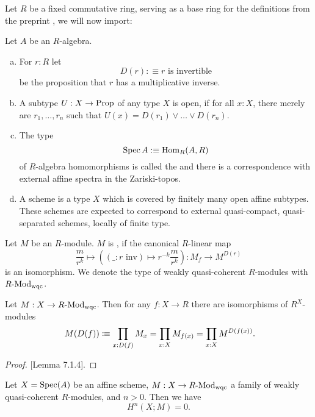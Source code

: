 
Let $R$ be a fixed commutative ring,
serving as a base ring for the definitions from the preprint \cite{draft},
we will now import:

\begin{definition}
  Let $A$ be an $R$-algebra.
  \begin{enumerate}[(a)]
  \item For $r:R$ let
    \[
      D(r):\equiv \text{$r$ is invertible}
    \]
    be the proposition that $r$ has a multiplicative inverse.
  \item A subtype $U:X\to \mathrm{Prop}$ of any type $X$ is open,
    if for all $x:X$, there merely are $r_1,\dots,r_n$ such that $U(x)=D(r_1)\vee \dots \vee D(r_n)$.
  \item The type
    \[
      \operatorname{Spec} A :\equiv \mathrm{Hom}_{R}(A,R)
    \]
    of $R$-algebra homomorphisms is called the 
    and there is a correspondence with external affine spectra in the Zariski-topos.
  \item A scheme is a type $X$ which is covered by finitely many open affine subtypes.
    These schemes are expected to correspond to
    external quasi-compact, quasi-separated schemes, locally of finite type.
  \end{enumerate}
\end{definition}

\begin{definition}
  Let $M$ be an $R$-module.
  $M$ is , if the canonical $R$-linear map
  \[
    \frac{m}{r^k}\mapsto ((\_: r\text{ inv})\mapsto r^{-k}\frac{m}{r^k}):M_f\to M^{D(r)}
  \]
  is an isomorphism.
  We denote the type of weakly quasi-coherent $R$-modules with $R\text{-}\mathrm{Mod}_{\text{wqc}}$.
\end{definition}

\begin{remark}
  Let $M:X\to R\text{-}\mathrm{Mod}_{\mathrm{wqc}}$.
  Then for any $f:X\to R$ there are isomorphisms of $R^X$-modules
  \[
  M(D(f))\colonequiv \prod_{x:D(f)}M_x  = \prod_{x:X}M_{f(x)} = \prod_{x:X}M^{D(f(x))}
  \rlap{.}
  \]
\end{remark}

\begin{proof}
  \cite{draft}[Lemma 7.1.4].
\end{proof}

\begin{theorem}
  \label{affine-vanishing}
Let $X = \operatorname{Spec}(A)$ be an affine scheme, 
$M : X \to R\text{-}\mathrm{Mod}_{\text{wqc}}$ a family of weakly quasi-coherent $R$-modules,
and $n > 0$.
Then we have
	\[
		H^n(X;M) = 0.
		\]
\end{theorem}

